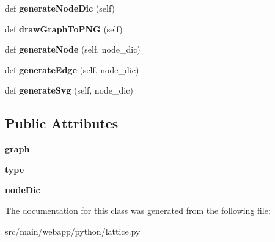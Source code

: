 \begin{DoxyCompactItemize}
def {\bfseries generate\+Node\+Dic} (self)
\item 
\mbox{\label{classpython_1_1lattice_1_1_lattice_a08836dad1acb7a52b37f0aab69072997}} 
def {\bfseries draw\+Graph\+To\+P\+NG} (self)
\item 
\mbox{\label{classpython_1_1lattice_1_1_lattice_ab322b5bbf45baea5bf8a3f5ae352b57b}} 
def {\bfseries generate\+Node} (self, node\+\_\+dic)
\item 
\mbox{\label{classpython_1_1lattice_1_1_lattice_abca256930805bfed84e4b1091296fc89}} 
def {\bfseries generate\+Edge} (self, node\+\_\+dic)
\item 
\mbox{\label{classpython_1_1lattice_1_1_lattice_ac70fe352932c746f6370d017db8aa4b9}} 
def {\bfseries generate\+Svg} (self, node\+\_\+dic)
\end{DoxyCompactItemize}
\subsection*{Public Attributes}
\begin{DoxyCompactItemize}
\item 
\mbox{\label{classpython_1_1lattice_1_1_lattice_ac8b977cbf973ada5522ef921f42bc926}} 
{\bfseries graph}
\item 
\mbox{\label{classpython_1_1lattice_1_1_lattice_aab64d794a1f0177bdc76f90f9ac626d3}} 
{\bfseries type}
\item 
\mbox{\label{classpython_1_1lattice_1_1_lattice_afdf195bf8ee5a1cf5fc889a53388c32e}} 
{\bfseries node\+Dic}
\end{DoxyCompactItemize}


The documentation for this class was generated from the following file\+:\begin{DoxyCompactItemize}
\item 
src/main/webapp/python/lattice.\+py\end{DoxyCompactItemize}
